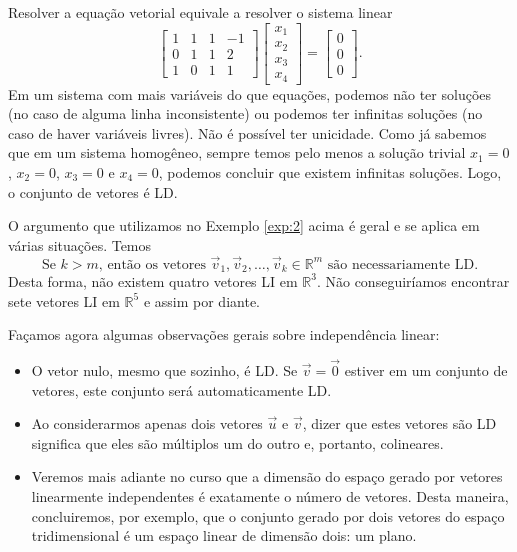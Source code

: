 \begin{ex}
Resolver a equação vetorial equivale a resolver o sistema linear
\begin{equation}
\left[
  \begin{array}{cccc}
    1 & 1 & 1 & -1 \\
    0 & 1 & 1 & 2  \\
    1 & 0 & 1 & 1 
  \end{array}
\right]
\left[
  \begin{array}{c}
    x_1 \\
    x_2 \\
    x_3 \\
    x_4 
  \end{array}
\right] =
\left[
  \begin{array}{c}
    0 \\
    0 \\
    0 
  \end{array}
\right].
\end{equation} Em um sistema com mais variáveis do que equações, podemos não ter soluções (no caso de alguma linha inconsistente) ou podemos ter infinitas soluções (no caso de haver variáveis livres). Não é possível ter unicidade. Como já sabemos que em um sistema homogêneo, sempre temos pelo menos a solução trivial $x_1 = 0$, $x_2=0$, $x_3=0$ e $x_4 = 0$, podemos concluir que existem infinitas soluções. Logo, o conjunto de vetores é LD.
\end{ex}

O argumento que utilizamos no Exemplo \ref{exp:2} acima é geral e se aplica em várias situações. Temos
\begin{equation}
\boxed{\text{Se $k>m$, então os vetores } \vec{v}_1, \vec{v}_2, \dots, \vec{v}_k  \in \mathbb{R}^m \text{ são necessariamente LD.}}
\end{equation} Desta forma, não existem quatro vetores LI em $\mathbb{R}^3$. Não conseguiríamos encontrar sete vetores LI em $\mathbb{R}^5$ e assim por diante.


Façamos agora algumas observações gerais sobre independência linear:
\begin{itemize}
  \item O vetor nulo, mesmo que sozinho, é LD. Se $\vec{v} = \vec{0}$ estiver em um conjunto de vetores, este conjunto será automaticamente LD.
  \item Ao considerarmos apenas dois vetores $\vec{u}$ e $\vec{v}$, dizer que estes vetores são LD significa que eles são múltiplos um do outro e, portanto, colineares.
  \item Veremos mais adiante no curso que a dimensão do espaço gerado por vetores linearmente independentes é exatamente o número de vetores. Desta maneira, concluiremos, por exemplo, que o conjunto gerado por dois vetores do espaço tridimensional é um espaço linear de dimensão dois: um plano.
\end{itemize}

